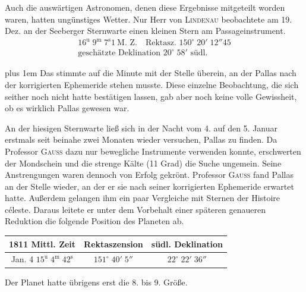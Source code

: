 Auch die auswärtigen Astronomen, denen diese Ergebnisse mitgeteilt worden waren, hatten ungünstiges Wetter. Nur Herr von \textsc{Lindenau} beobachtete am 19. Dez. an der Seeberger Sternwarte einen kleinen Stern am Passageinstrument.
\[\begin{gathered}16^{\text{u}}\;9^{\text{m}}\;7^{\text{s}}1\ \text{M. Z.}\quad\text{Rektasz. }150^\circ\;20'\;12''45\\\text{geschätzte Deklination }20^\circ\;58'\text{ südl.}\end{gathered}\]
{\rightskip=0pt plus 1em \noindent Das stimmte auf die Minute mit der Stelle überein, an der Pallas nach der korrigierten Ephemeride stehen musste. Diese einzelne Beobachtung, die sich seither noch nicht hatte bestätigen lassen, gab aber noch keine volle Gewissheit, ob es wirklich Pallas gewesen war.\par}

\par\indent An der hiesigen Sternwarte ließ sich in der Nacht vom 4. auf den 5. Januar erstmals seit beinahe zwei Monaten wieder versuchen, Pallas zu finden. Da Professor \textsc{Gauss} dazu nur bewegliche Instrumente verwenden konnte, erschwerten der Mondschein und die strenge Kälte (11 Grad) die Suche ungemein. Seine Anstrengungen waren dennoch von Erfolg gekrönt. Professor \textsc{Gauss} fand Pallas an der Stelle wieder, an der er sie nach seiner korrigierten Ephemeride erwartet hatte. Außerdem gelangen ihm ein paar Vergleiche mit Sternen der Histoire céleste. Daraus leitete er unter dem Vorbehalt einer späteren genaueren Reduktion die folgende Position des Planeten ab.

\begin{center}\fontsize{10}{12}\selectfont\setlength{\tabcolsep}{4pt}\renewcommand{\arraystretch}{1.15}\begin{tabular}{c|c|c}
1811 Mittl. Zeit & Rektaszension & südl. Deklination\\\hline
Jan. 4 $15^{\text{u}}\;4^{\text{m}}\;42^{\text{s}}$ & $151^\circ\;40'\;5''$ & $22^\circ\;22'\;36''$\\
\end{tabular}\end{center}

\par\indent Der Planet hatte übrigens erst die 8. bis 9. Größe.


